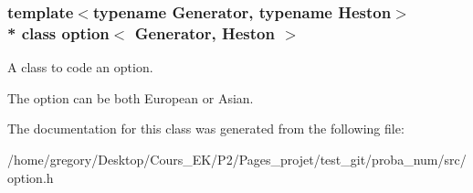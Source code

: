 \subsubsection*{template$<$typename Generator, typename Heston$>$\\*
class option$<$ Generator, Heston $>$}

A class to code an option. 

The option can be both European or Asian. 

The documentation for this class was generated from the following file\+:\begin{DoxyCompactItemize}
\item 
/home/gregory/\+Desktop/\+Cours\+\_\+\+E\+K/\+P2/\+Pages\+\_\+projet/test\+\_\+git/proba\+\_\+num/src/option.\+h\end{DoxyCompactItemize}
